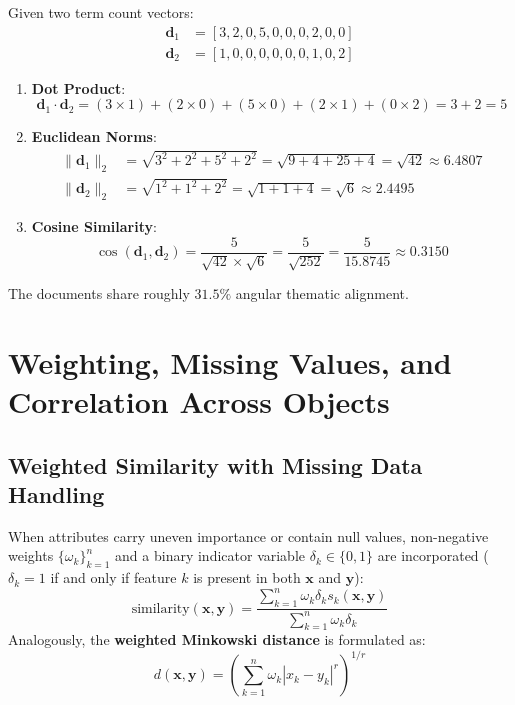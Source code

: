 \begin{example}
Given two term count vectors:
\begin{align}
    \mathbf{d}_1 &= [3, 2, 0, 5, 0, 0, 0, 2, 0, 0] \\
    \mathbf{d}_2 &= [1, 0, 0, 0, 0, 0, 0, 1, 0, 2]
\end{align}
\begin{enumerate}
    \item \textbf{Dot Product}:
    \begin{equation}
        \mathbf{d}_1 \cdot \mathbf{d}_2 = (3 \times 1) + (2 \times 0) + (5 \times 0) + (2 \times 1) + (0 \times 2) = 3 + 2 = 5
    \end{equation}
    \item \textbf{Euclidean Norms}:
    \begin{align}
        \|\mathbf{d}_1\|_2 &= \sqrt{3^2 + 2^2 + 5^2 + 2^2} = \sqrt{9 + 4 + 25 + 4} = \sqrt{42} \approx 6.4807 \\
        \|\mathbf{d}_2\|_2 &= \sqrt{1^2 + 1^2 + 2^2} = \sqrt{1 + 1 + 4} = \sqrt{6} \approx 2.4495
    \end{align}
    \item \textbf{Cosine Similarity}:
    \begin{equation}
        \cos(\mathbf{d}_1, \mathbf{d}_2) = \frac{5}{\sqrt{42} \times \sqrt{6}} = \frac{5}{\sqrt{252}} = \frac{5}{15.8745} \approx 0.3150
    \end{equation}
\end{enumerate}
The documents share roughly $31.5\%$ angular thematic alignment.
\end{example}

\section{Weighting, Missing Values, and Correlation Across Objects}
\label{sec:dm-weighting-correlation}

\subsection{Weighted Similarity with Missing Data Handling}
When attributes carry uneven importance or contain null values, non-negative weights $\{\omega_k\}_{k=1}^n$ and a binary indicator variable $\delta_k \in \{0, 1\}$ are incorporated ($\delta_k = 1$ if and only if feature $k$ is present in both $\mathbf{x}$ and $\mathbf{y}$):
\begin{equation}
    \text{similarity}(\mathbf{x}, \mathbf{y}) = \frac{\sum_{k=1}^n \omega_k \delta_k s_k(\mathbf{x}, \mathbf{y})}{\sum_{k=1}^n \omega_k \delta_k}
\end{equation}
Analogously, the \textbf{weighted Minkowski distance} is formulated as:
\begin{equation}
    d(\mathbf{x}, \mathbf{y}) = \left( \sum_{k=1}^n \omega_k |x_k - y_k|^r \right)^{1/r}
\end{equation}

